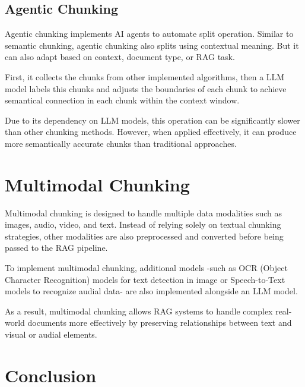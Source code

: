 \documentclass[conference]{IEEEtran}
\begin{document}
\subsection{Agentic Chunking}
Agentic chunking implements AI agents to automate split operation. Similar to semantic chunking, agentic chunking also splits using contextual meaning. But it can also adapt based on context, document type, or RAG task.

First, it collects the chunks from other implemented algorithms, then a LLM model labels this chunks and adjusts the boundaries of each chunk to achieve semantical connection in each chunk within the context window.

Due to its dependency on LLM models, this operation can be significantly slower than other chunking methods. However, when applied effectively, it can produce more semantically accurate chunks than traditional approaches.

\section{Multimodal Chunking}
Multimodal chunking is designed to handle multiple data modalities such as images, audio, video, and text. Instead of relying solely on textual chunking strategies, other modalities are also preprocessed and converted before being passed to the RAG pipeline.

To implement multimodal chunking, additional models -such as OCR (Object Character Recognition) models for text detection in image or Speech-to-Text models to recognize audial data- are also implemented alongside an LLM model.

As a result, multimodal chunking allows RAG systems to handle complex real-world documents more effectively by preserving relationships between text and visual or audial elements.

\section{Conclusion}
\end{document}
